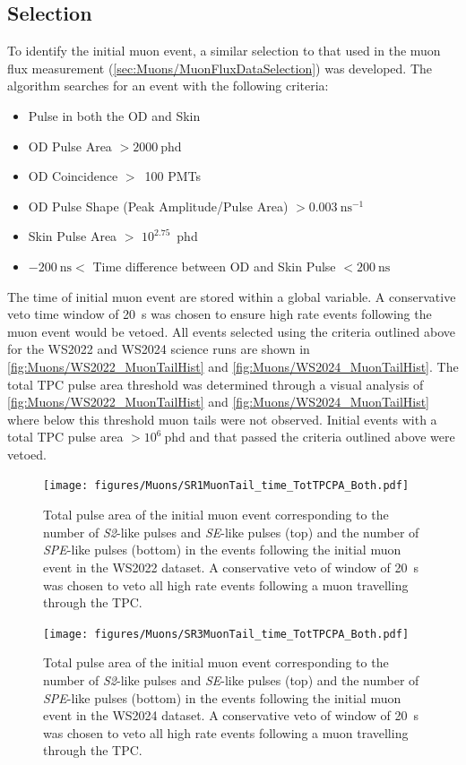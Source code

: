 \subsection{Selection}\label{sec:Muons/MuonVetoCutDesc}
To identify the initial muon event, a similar selection to that used in the muon flux measurement (\autoref{sec:Muons/MuonFluxDataSelection}) was developed. The algorithm searches for an event with the following criteria:
\begin{itemize}
    \item Pulse in both the OD and Skin
    \item OD Pulse Area $>2000~\text{phd}$
    \item OD Coincidence $>$~100 PMTs
    \item OD Pulse Shape (Peak Amplitude/Pulse Area) $>0.003~\text{ns}^{-1}$
    \item Skin Pulse Area $>$ $10^{2.75}$~phd
    \item $-200~\text{ns}<$ Time difference between OD and Skin Pulse $< 200~\text{ns}$
\end{itemize}
The time of initial muon event are stored within a global variable. A conservative veto time window of 20~s was chosen to ensure high rate events following the muon event would be vetoed. All events selected using the criteria outlined above for the WS2022 and WS2024 science runs are shown in \autoref{fig:Muons/WS2022_MuonTailHist} and \autoref{fig:Muons/WS2024_MuonTailHist}. The total TPC pulse area threshold was determined through a visual analysis of \autoref{fig:Muons/WS2022_MuonTailHist} and \autoref{fig:Muons/WS2024_MuonTailHist} where below this threshold muon tails were not observed. Initial events with a total TPC pulse area $>10^{6}~\text{phd}$ and that passed the criteria outlined above were vetoed.
\begin{figure}[ht!]
    \centering
    \texttt{[image: figures/Muons/SR1MuonTail\_time\_TotTPCPA\_Both.pdf]}
    \caption{Total pulse area of the initial muon event corresponding to the number of \textit{S2}-like pulses and \textit{SE}-like pulses (top) and the number of \textit{SPE}-like pulses (bottom) in the events following the initial muon event in the WS2022 dataset. A conservative veto of window of 20~s was chosen to veto all high rate events following a muon travelling through the TPC.}
    \label{fig:Muons/WS2022_MuonTailHist}
\end{figure}
\begin{figure}[ht!]
    \centering
    \texttt{[image: figures/Muons/SR3MuonTail\_time\_TotTPCPA\_Both.pdf]}
    \caption{Total pulse area of the initial muon event corresponding to the number of \textit{S2}-like pulses and \textit{SE}-like pulses (top) and the number of \textit{SPE}-like pulses (bottom) in the events following the initial muon event in the WS2024 dataset. A conservative veto of window of 20~s was chosen to veto all high rate events following a muon travelling through the TPC.}
    \label{fig:Muons/WS2024_MuonTailHist}
\end{figure}

